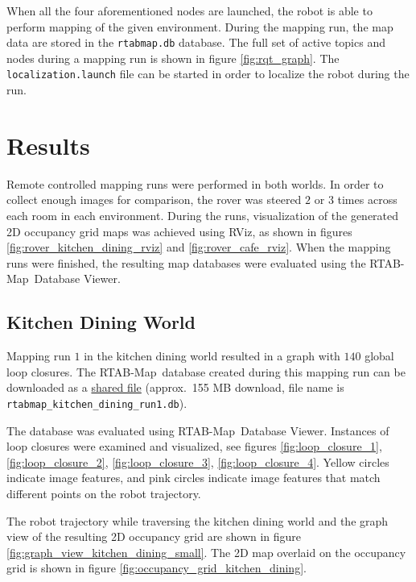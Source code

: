 \documentclass[10pt, journal, compsoc]{IEEEtran}
\newcommand{\rtab}{RTAB-Map}
\begin{document}
When all the four aforementioned nodes are launched, the robot is able to perform mapping of the given environment. During the mapping run, the map data are stored in the \texttt{rtabmap.db} database. The full set of active topics and nodes during a mapping run is shown in figure \ref{fig:rqt_graph}. The \texttt{localization.launch} file can be started in order to localize the robot during the run.  

\section{Results}
\label{sec:results}
Remote controlled mapping runs were performed in both worlds. In order to collect enough images for comparison, the rover was steered $2$ or $3$ times across each room in each environment. During the runs, visualization of the generated 2D occupancy grid maps was achieved using RViz, as shown in figures \ref{fig:rover_kitchen_dining_rviz} and \ref{fig:rover_cafe_rviz}. When the mapping runs were finished, the resulting map databases were evaluated using the \rtab\ Database Viewer.
\subsection{Kitchen Dining World}
Mapping run $1$ in the kitchen dining world resulted in a graph with $140$ global loop closures. The \rtab\ database created during this mapping run can be downloaded as a \href{https://drive.google.com/open?id=1t1IpTFzVJdJpQvhg2gkvDuGDFBH2YYIq}{shared file} (approx.\ 155 MB download, file name is \texttt{rtabmap\_kitchen\_dining\_run1.db}).

The database was evaluated using \rtab \ Database Viewer. Instances of loop closures were examined and visualized, see figures \ref{fig:loop_closure_1}, \ref{fig:loop_closure_2}, \ref{fig:loop_closure_3}, \ref{fig:loop_closure_4}. Yellow circles indicate image features, and pink circles indicate image features that match different points on the robot trajectory.

The robot trajectory while traversing the kitchen dining world and the graph view of the resulting 2D occupancy grid are shown in figure \ref{fig:graph_view_kitchen_dining_small}. The 2D map overlaid on the occupancy grid is shown in figure \ref{fig:occupancy_grid_kitchen_dining}. 
\end{document}

